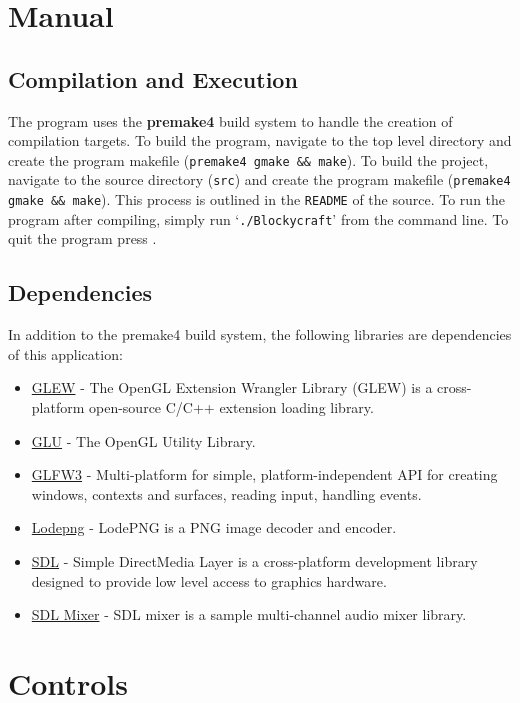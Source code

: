 \documentclass[a4paper,11pt,titlepage]{scrartcl}
\begin{document}
\section{Manual}
\subsection{Compilation and Execution}
The program uses the \textbf{premake4} build system to handle the creation of compilation targets.  To build the program, navigate to the top level directory and create the program makefile (\texttt{premake4 gmake \&\& make}).  To build the project, navigate to the source directory (\texttt{src}) and create the program makefile (\texttt{premake4 gmake \&\& make}).
This process is outlined in the \texttt{README} of the source.  To run the program after compiling, simply run `\texttt{./Blockycraft}' from the command line.  To quit the program press .

\subsection{Dependencies}
In addition to the premake4 build system, the following libraries are dependencies of this application: 
\begin{itemize}
	\item \href{https://github.com/nigels-com/glew}{GLEW} - The OpenGL Extension Wrangler Library (GLEW) is a cross-platform open-source C/C++ extension loading library.
	\item \href{https://www.opengl.org/resources/libraries/}{GLU} - The OpenGL Utility Library.
	\item \href{http://www.glfw.org/docs/latest/}{GLFW3} - Multi-platform for simple, platform-independent API for creating windows, contexts and surfaces, reading input, handling events.
	\item \href{http://lodev.org/lodepng/}{Lodepng} - LodePNG is a PNG image decoder and encoder.
	\item \href{https://www.libsdl.org/}{SDL} - Simple DirectMedia Layer is a cross-platform development library designed to provide low level access to graphics hardware.
	\item \href{https://www.libsdl.org/projects/SDL_mixer/}{SDL Mixer} - SDL mixer is a sample multi-channel audio mixer library. 
\end{itemize}

\section{Controls}
\end{document}
